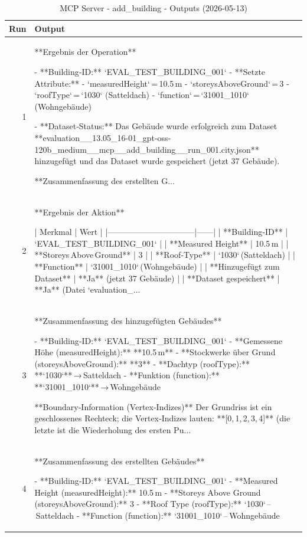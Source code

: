 \documentclass[a4paper,11pt]{article}
\begin{document}
\clearpage

\begin{table}[ht]
\centering
\scriptsize
\caption{MCP Server - add\_building - Outputs (2026-05-13)}
\label{tab:mcp\_add\_building\_outputs\_2026-05-13}
\begin{tabular}{r p{12cm}}
\hline
Run & Output \\
\hline
1 & **Ergebnis der Operation**

- **Building‑ID:** `EVAL\_TEST\_BUILDING\_001`  
- **Setzte Attribute:**  
  - `measuredHeight` = 10.5 m  
  - `storeysAboveGround` = 3  
  - `roofType` = `1030` (Satteldach)  
  - `function` = `31001\_1010` (Wohngebäude)  

- **Dataset‑Status:** Das Gebäude wurde erfolgreich zum Dataset **evaluation\_\_13.05\_16-01\_gpt-oss-120b\_medium\_\_mcp\_\_add\_building\_\_run\_001.city.json** hinzugefügt und das Dataset wurde gespeichert (jetzt 37 Gebäude).

**Zusammenfassung des erstellten G... \\
2 & **Ergebnis der Aktion**

| Merkmal                         | Wert |
|--------------------------------|------|
| **Building‑ID**                | `EVAL\_TEST\_BUILDING\_001` |
| **Measured Height**            | 10.5 m |
| **Storeys Above Ground**       | 3 |
| **Roof‑Type**                  | `1030` (Satteldach) |
| **Function**                   | `31001\_1010` (Wohngebäude) |
| **Hinzugefügt zum Dataset**    | **Ja** (jetzt 37 Gebäude) |
| **Dataset gespeichert**        | **Ja** (Datei `evaluation\_... \\
3 & **Zusammenfassung des hinzugefügten Gebäudes**

- **Building‑ID:** `EVAL\_TEST\_BUILDING\_001`  
- **Gemessene Höhe (measuredHeight):** **10.5 m**  
- **Stockwerke über Grund (storeysAboveGround):** **3**  
- **Dachtyp (roofType):** **`1030`** → Satteldach  
- **Funktion (function):** **`31001\_1010`** → Wohngebäude  

**Boundary‑Information (Vertex‑Indizes)**  
Der Grundriss ist ein geschlossenes Rechteck; die Vertex‑Indizes lauten: **[0, 1, 2, 3, 4]** (die letzte ist die Wiederholung des ersten Pu... \\
4 & **Zusammenfassung des erstellten Gebäudes**

- **Building‑ID:** `EVAL\_TEST\_BUILDING\_001`  
- **Measured Height (measuredHeight):** 10.5 m  
- **Storeys Above Ground (storeysAboveGround):** 3  
- **Roof Type (roofType):** `1030` – Satteldach  
- **Function (function):** `31001\_1010` – Wohngebäude  


\end{tabular}
\end{table}
\end{document}
